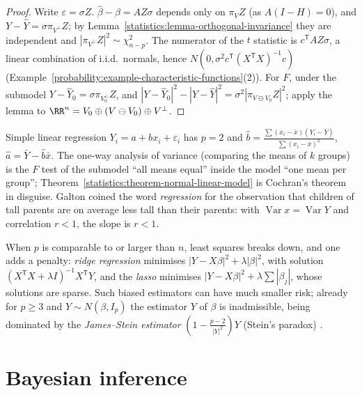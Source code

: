 \begin{proof}
Write $\varepsilon = \sigma Z$. $\hat\beta - \beta = AZ\sigma$ depends only on $\pi_VZ$ (as $A(I - H) = 0$), and $Y - \hat Y = \sigma\pi_{V^\perp}Z$; by Lemma~\ref{statistics:lemma-orthogonal-invariance} they are independent and
$|\pi_{V^\perp}Z|^2 \sim \chi^2_{n-p}$. The numerator of the $t$ statistic is $c^{\mathsf T}AZ\sigma$, a linear combination of i.i.d.\ normals, hence $N(0, \sigma^2c^{\mathsf T}(X^{\mathsf T}X)^{-1}c)$
(Example~\ref{probability:example-characteristic-functions}(2)). For $F$, under the submodel $Y - \hat Y_0 = \sigma\pi_{V_0^\perp}Z$, and $|Y - \hat Y_0|^2 - |Y - \hat Y|^2 = \sigma^2|\pi_{V \ominus V_0}Z|^2$; apply the lemma to
$\RR^n = V_0 \oplus (V \ominus V_0) \oplus V^\perp$.
\end{proof}

\begin{example}\label{statistics:example-regression}
Simple linear regression $Y_i = a + bx_i + \varepsilon_i$ has $p = 2$ and
$\hat b = \frac{\sum(x_i - \bar x)(Y_i - \bar Y)}{\sum(x_i - \bar x)^2}$, $\hat a = \bar Y - \hat b\bar x$. The one-way analysis of variance (comparing the means of $k$ groups) is the $F$ test of the submodel ``all means equal'' inside the
model ``one mean per group''; Theorem~\ref{statistics:theorem-normal-linear-model} is Cochran's theorem in disguise. Galton coined the word \emph{regression} for the observation that children of tall parents are on average less tall
than their parents: with $\operatorname{Var}x = \operatorname{Var}Y$ and correlation $r < 1$, the slope is $r < 1$.
\end{example}

\begin{remark}\label{statistics:remark-high-dimensional}
When $p$ is comparable to or larger than $n$, least squares breaks down, and one adds a penalty: \emph{ridge regression} minimises $|Y - X\beta|^2 + \lambda|\beta|^2$, with solution $(X^{\mathsf T}X + \lambda I)^{-1}X^{\mathsf T}Y$, and the
\emph{lasso} minimises $|Y - X\beta|^2 + \lambda\sum|\beta_j|$, whose solutions are sparse. Such biased estimators can have much smaller risk; already for $p \geq 3$ and $Y \sim N(\beta, I_p)$ the estimator $Y$ of $\beta$ is
inadmissible, being dominated by the \emph{James--Stein estimator} $(1 - \frac{p - 2}{|Y|^2})Y$ (Stein's paradox) \cite{lehmann-casella}.
\end{remark}

\section{Bayesian inference}\label{statistics:section-bayesian}

